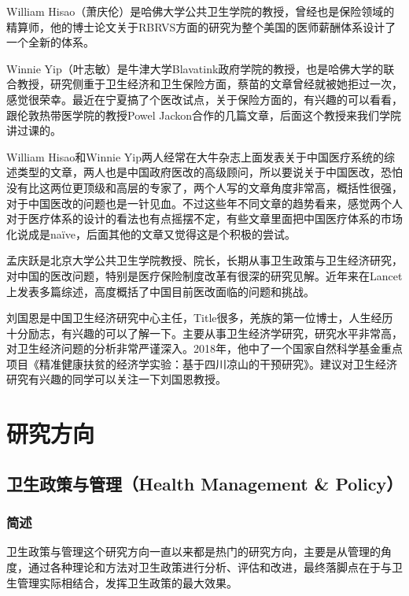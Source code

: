 \documentclass[11pt, a4paper]{article}
\begin{document}
William Hisao（萧庆伦）是哈佛大学公共卫生学院的教授，曾经也是保险领域的精算师，他的博士论文关于RBRVS方面的研究为整个美国的医师薪酬体系设计了一个全新的体系。

Winnie Yip（叶志敏）是牛津大学Blavatink政府学院的教授，也是哈佛大学的联合教授，研究侧重于卫生经济和卫生保险方面，蔡苗的文章曾经就被她拒过一次，感觉很荣幸。最近在宁夏搞了个医改试点，关于保险方面的，有兴趣的可以看看，跟伦敦热带医学院的教授Powel Jackon合作的几篇文章，后面这个教授来我们学院讲过课的。

William Hisao和Winnie Yip两人经常在大牛杂志上面发表关于中国医疗系统的综述类型的文章，两人也是中国政府医改的高级顾问，所以要说关于中国医改，恐怕没有比这两位更顶级和高层的专家了，两个人写的文章角度非常高，概括性很强，对于中国医改的问题也是一针见血。不过这些年不同文章的趋势看来，感觉两个人对于医疗体系的设计的看法也有点摇摆不定，有些文章里面把中国医疗体系的市场化说成是naïve，后面其他的文章又觉得这是个积极的尝试。

孟庆跃是北京大学公共卫生学院教授、院长，长期从事卫生政策与卫生经济研究，对中国的医改问题，特别是医疗保险制度改革有很深的研究见解。近年来在Lancet上发表多篇综述，高度概括了中国目前医改面临的问题和挑战。

刘国恩是中国卫生经济研究中心主任，Title很多，羌族的第一位博士，人生经历十分励志，有兴趣的可以了解一下。主要从事卫生经济学研究，研究水平非常高，对卫生经济问题的分析非常严谨深入。2018年，他中了一个国家自然科学基金重点项目《精准健康扶贫的经济学实验：基于四川凉山的干预研究》。建议对卫生经济研究有兴趣的同学可以关注一下刘国恩教授。

\section{研究方向}

\subsection{卫生政策与管理（Health Management \& Policy）}

\subsubsection{简述}

卫生政策与管理这个研究方向一直以来都是热门的研究方向，主要是从管理的角度，通过各种理论和方法对卫生政策进行分析、评估和改进，最终落脚点在于与卫生管理实际相结合，发挥卫生政策的最大效果。
\end{document}
